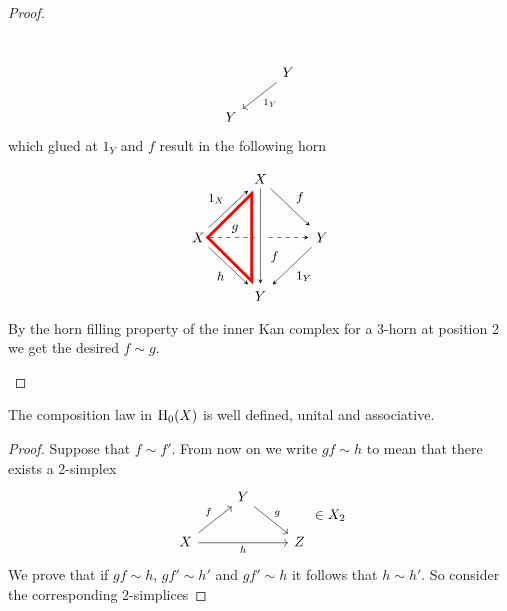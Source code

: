 \begin{proof}
\begin{itemize}
\[\begin{tikzcd}
            \\
            &
            Y
            \arrow[ld, "1_Y"]
            \\
            Y
        \end{tikzcd}
        \] which glued at $1_Y$ and $f$ result in the following horn
        \[
        \begin{tikzpicture}[>=stealth,->,shorten >=2pt,looseness=.5,auto]
            \matrix[anchor=center, column sep=1cm, row sep=1cm] at (0,0)
            {
                                & \node(X_1) {$X$};   &                 \\
             \node(X_0) {$X$};     &                  & \node(X_2) {$Y$};  \\
                                & \node(X_3) {$Y$};   &                 \\
            };
            \draw[line width=2pt,color=red] (-0.2,1.1) -- (-0.2,-1.1) -- (-1.3, 0) -- cycle;
            \begin{scope}[every node/.style={font=\small\itshape}]
                \draw (X_1) -- node [midway] {$f$} (X_2);
                \draw (X_0) -- node [midway] {$1_X$} (X_1);
                \draw (X_0) -- node [midway, swap] {$h$}(X_3);
                \draw [dashed] (X_0) -- node [near start] {$g$}(X_2);
                \draw [-,line width=8pt,draw=white]
                (X_1) -- node [pos=0.7] {$f$} (X_3);
                \draw (X_1) -- (X_3);
                \draw (X_2) -- node [midway] {$1_Y$} (X_3);
            \end{scope}
    \end{tikzpicture}
    \]
    By the horn filling property of the inner Kan complex for a 3-horn at position 2 we get the desired $f \sim g$.
    \end{itemize}
\end{proof}

\begin{prop}
    The composition law in $\H0(X)$ is well defined, unital and associative.
\end{prop}

\begin{proof}
    Suppose that $f \sim f'$. 
    From now on we write $gf \sim h$ to mean that there exists a 2-simplex
    \[
    \begin{tikzcd}
        &
        Y
        \arrow[rd,"g"]
        &\\
        X
        \arrow[ru, "f"]
        \arrow[rr,"h"']
        &
        &
        Z
    \end{tikzcd}   
    \in X_2
    \]
    We prove that if $gf \sim h$, $gf' \sim h'$ and $gf' \sim h$ it follows that $h \sim h'$. 
    So consider the corresponding 2-simplices
\end{proof}

